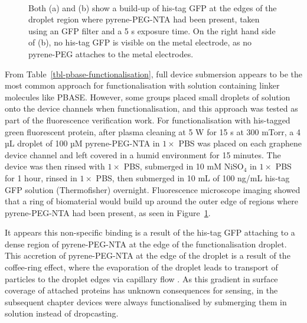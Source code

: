 \documentclass[
  a4paper,
]{scrbook}
\begin{document}
\begin{figure}
\begin{minipage}[t]{0.45\linewidth}
{{}

}

\end{minipage}%
%
\begin{minipage}[t]{0.01\linewidth}

{\centering 

~

}

\end{minipage}%

\caption[Fluorescence images showing the impact of the coffee-ring
effect on the surface distribution of fluorescent protein across a
carbon nanotube network device
post-functionalisation.]{\label{fig-GFP-coffee-ring}Both (a) and (b)
show a build-up of his-tag GFP at the edges of the droplet region where
pyrene-PEG-NTA had been present, taken using an GFP filter and a 5 s
exposure time. On the right hand side of (b), no his-tag GFP is visible
on the metal electrode, as no pyrene-PEG attaches to the metal
electrodes.}

\end{figure}

From Table~\ref{tbl-pbase-functionalisation}, full device submersion
appears to be the most common approach for functionalisation with
solution containing linker molecules like PBASE. However, some groups
placed small droplets of solution onto the device channels when
functionalisation, and this approach was tested as part of the
fluorescence verification work. For functionalisation with his-tagged
green fluorescent protein, after plasma cleaning at 5 W for 15 s at 300
mTorr, a 4 µL droplet of 100 µM pyrene-PEG-NTA in \(1 \times\) PBS was
placed on each graphene device channel and left covered in a humid
environment for 15 minutes. The device was then rinsed with \(1 \times\)
PBS, submerged in 10 mM NiSO\(_4\) in \(1 \times\) PBS for 1 hour,
rinsed in \(1 \times\) PBS, then submerged in 10 mL of 100 ng/mL his-tag
GFP solution (Thermofisher) overnight. Fluorescence microscope imaging
showed that a ring of biomaterial would build up around the outer edge
of regions where pyrene-PEG-NTA had been present, as seen in
Figure~\ref{fig-GFP-coffee-ring}.

It appears this non-specific binding is a result of the his-tag GFP
attaching to a dense region of pyrene-PEG-NTA at the edge of the
functionalisation droplet. This accretion of pyrene-PEG-NTA at the edge
of the droplet is a result of the coffee-ring effect, where the
evaporation of the droplet leads to transport of particles to the
droplet edges via capillary flow \autocite{Deegan1997,Shimobayashi2018}.
As this gradient in surface coverage of attached proteins has unknown
consequences for sensing, in the subsequent chapter devices were always
functionalised by submerging them in solution instead of dropcasting.
\end{document}
